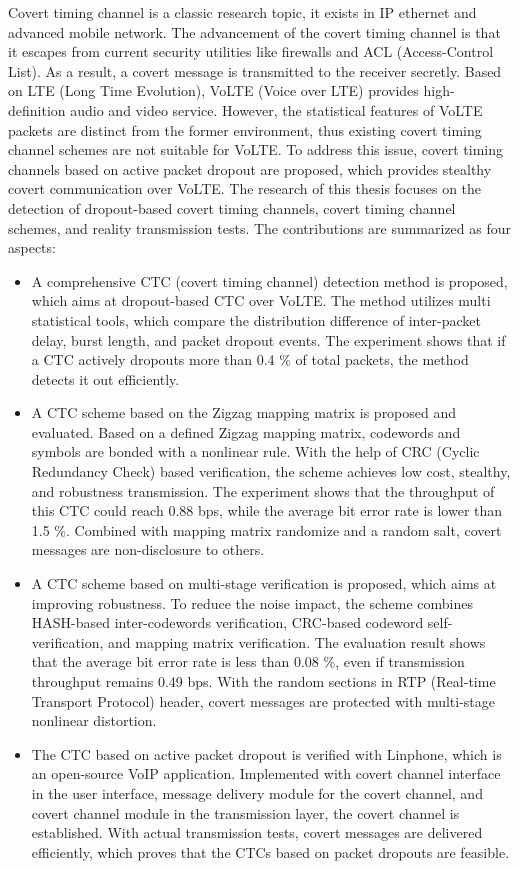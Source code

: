 \begin{englishabstract}

   Covert timing channel is a classic research topic, it exists in IP ethernet and advanced mobile network. The advancement of the covert timing channel is that it escapes from current security utilities like firewalls and ACL (Access-Control List). As a result, a covert message is transmitted to the receiver secretly. Based on LTE (Long Time Evolution), VoLTE (Voice over LTE) provides high-definition audio and video service. However, the statistical features of VoLTE packets are distinct from the former environment, thus existing covert timing channel schemes are not suitable for VoLTE. To address this issue, covert timing channels based on active packet dropout are proposed, which provides stealthy covert communication over VoLTE. The research of this thesis focuses on the detection of dropout-based covert timing channels, covert timing channel schemes, and reality transmission tests. The contributions are summarized as four aspects: 
\begin{itemize}
   \item A comprehensive CTC (covert timing channel) detection method is proposed, which aims at dropout-based CTC over VoLTE. The method utilizes multi statistical tools, which compare the distribution difference of inter-packet delay, burst length, and packet dropout events. The experiment shows that if a CTC actively dropouts more than 0.4 \% of total packets, the method detects it out efficiently.
   \item A CTC scheme based on the Zigzag mapping matrix is proposed and evaluated. Based on a defined Zigzag mapping matrix, codewords and symbols are bonded with a nonlinear rule. With the help of CRC (Cyclic Redundancy Check) based verification, the scheme achieves low cost, stealthy, and robustness transmission. The experiment shows that the throughput of this CTC could reach 0.88 bps, while the average bit error rate is lower than 1.5 \%. Combined with mapping matrix randomize and a random salt, covert messages are non-disclosure to others.
   \item A CTC scheme based on multi-stage verification is proposed, which aims at improving robustness. To reduce the noise impact, the scheme combines HASH-based inter-codewords verification, CRC-based codeword self-verification, and mapping matrix verification. The evaluation result shows that the average bit error rate is less than 0.08 \%, even if transmission throughput remains 0.49 bps. With the random sections in RTP (Real-time Transport Protocol) header, covert messages are protected with multi-stage nonlinear distortion.
   \item The CTC based on active packet dropout is verified with Linphone, which is an open-source VoIP application. Implemented with covert channel interface in the user interface, message delivery module for the covert channel, and covert channel module in the transmission layer, the covert channel is established. With actual transmission tests, covert messages are delivered efficiently, which proves that the CTCs based on packet dropouts are feasible.
\end{itemize}
   
\end{englishabstract}
